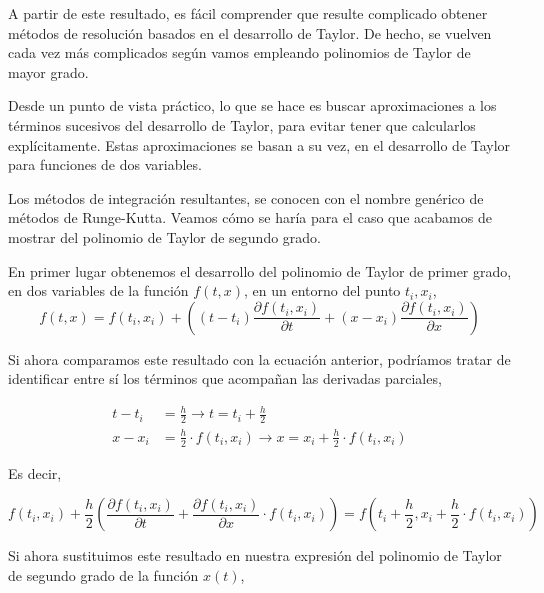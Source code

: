 A partir de este resultado, es fácil comprender que resulte complicado obtener métodos de resolución basados en el desarrollo de Taylor. De hecho, se vuelven cada vez más complicados según vamos empleando polinomios de Taylor de mayor grado.

Desde un punto de vista práctico, lo que se hace es buscar aproximaciones a los términos sucesivos del desarrollo de Taylor, para evitar tener que calcularlos explícitamente. Estas aproximaciones se basan a su vez, en el desarrollo de Taylor para funciones de dos variables.

Los métodos de integración resultantes, se conocen con el nombre genérico de métodos de Runge-Kutta. Veamos cómo se haría para el caso que acabamos de mostrar del polinomio de Taylor de segundo grado.

En primer lugar obtenemos el desarrollo del polinomio de Taylor de primer grado, en dos variables de la función $f(t,x)$, en un entorno del punto $t_i,x_i$,
\begin{equation*}
f(t,x)=f(t_i,x_i)+\left((t-t_i)\frac{\partial f(t_i,x_i)}{\partial t}+(x-x_i)\frac{\partial f(t_i,x_i)}{\partial x}\right)
\end{equation*}

Si ahora comparamos este resultado con la ecuación anterior, podríamos tratar de identificar entre sí los términos que acompañan las derivadas parciales, 

\begin{align*}
t-t_i&=\frac{h}{2} \rightarrow t=t_i+\frac{h}{2}\\
x-x_i&=\frac{h}{2}\cdot f(t_i,x_i) \rightarrow x=x_i+\frac{h}{2}\cdot f(t_i,x_i)
\end{align*}

Es decir,

\begin{equation*}
f(t_i,x_i)+\frac{h}{2}\left(\frac{\partial f(t_i,x_i)}{\partial t}+\frac{\partial f(t_i,x_i)}{\partial x}\cdot f(t_i,x_i)\right)=f(t_i+\frac{h}{2},x_i+\frac{h}{2}\cdot f(t_i,x_i))
\end{equation*}

Si ahora sustituimos este resultado en nuestra expresión del polinomio de Taylor de segundo grado de la función $x(t)$,

